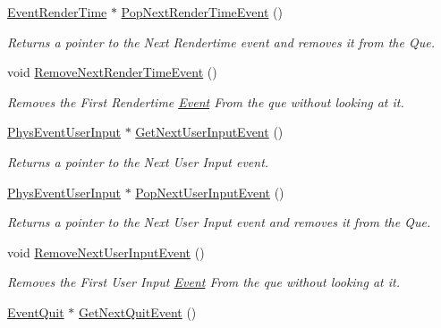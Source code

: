 \begin{DoxyCompactItemize}
\hyperlink{classphys_1_1EventRenderTime}{EventRenderTime} $\ast$ \hyperlink{classphys_1_1EventManager_aa7e800d34ad8b9295ac87dfa822a2a03}{PopNextRenderTimeEvent} ()
\begin{DoxyCompactList}\small\item\em Returns a pointer to the Next Rendertime event and removes it from the Que. \item\end{DoxyCompactList}\item 
void \hyperlink{classphys_1_1EventManager_af1204912be3554312e66d3a777c1f99b}{RemoveNextRenderTimeEvent} ()
\begin{DoxyCompactList}\small\item\em Removes the First Rendertime \hyperlink{classphys_1_1Event}{Event} From the que without looking at it. \item\end{DoxyCompactList}\item 
\hyperlink{classPhysEventUserInput}{PhysEventUserInput} $\ast$ \hyperlink{classphys_1_1EventManager_ad61b660278f03702e0c564c7ad2dbc5d}{GetNextUserInputEvent} ()
\begin{DoxyCompactList}\small\item\em Returns a pointer to the Next User Input event. \item\end{DoxyCompactList}\item 
\hyperlink{classPhysEventUserInput}{PhysEventUserInput} $\ast$ \hyperlink{classphys_1_1EventManager_a32d29a1a66e1f77b758f08e31a922a5a}{PopNextUserInputEvent} ()
\begin{DoxyCompactList}\small\item\em Returns a pointer to the Next User Input event and removes it from the Que. \item\end{DoxyCompactList}\item 
void \hyperlink{classphys_1_1EventManager_add41b5f4d2942461bcaf40a97ad40b09}{RemoveNextUserInputEvent} ()
\begin{DoxyCompactList}\small\item\em Removes the First User Input \hyperlink{classphys_1_1Event}{Event} From the que without looking at it. \item\end{DoxyCompactList}\item 
\hyperlink{classphys_1_1EventQuit}{EventQuit} $\ast$ \hyperlink{classphys_1_1EventManager_ad7da09e5422b1db79ac4187ee9198d0c}{GetNextQuitEvent} ()

\end{DoxyCompactItemize}
